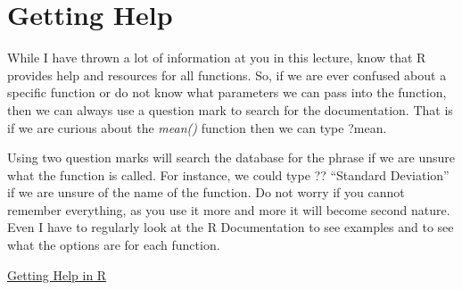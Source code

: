 \documentclass[
  letterpaper,
  DIV=11,
  numbers=noendperiod]{scrreprt}
\begin{document}
\section{Getting Help}\label{getting-help}

While I have thrown a lot of information at you in this lecture, know
that R provides help and resources for all functions. So, if we are ever
confused about a specific function or do not know what parameters we can
pass into the function, then we can always use a question mark to search
for the documentation. That is if we are curious about the \emph{mean()}
function then we can type ?mean.

Using two question marks will search the database for the phrase if we
are unsure what the function is called. For instance, we could type ??
``Standard Deviation'' if we are unsure of the name of the function. Do
not worry if you cannot remember everything, as you use it more and more
it will become second nature. Even I have to regularly look at the R
Documentation to see examples and to see what the options are for each
function.

\begin{watch}{}{}
    \href{https://youtu.be/SE8j5P77XUo}{Getting Help in R}
\end{watch}
\end{document}

